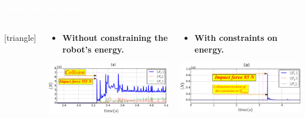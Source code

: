 \begin{frame}
\frametitle{{\textcolor{white}{\hspace{0.2cm}Simulation results 1}}}
\begin{columns}
\column{\dimexpr\paperwidth-4pt}
[triangle] 
\begin{itemize}
\begin{columns}
\column{.5\paperwidth}
\begin{center}
\begin{itemize}
\addtolength{\itemindent}{3mm}
\item \textbf{Without constraining the robot's energy.}
\end{itemize}
\vspace{0.5mm}
\hspace{1mm}
\includegraphics[width=0.89\columnwidth]{figures/ep__f_tau_!!!!1.pdf}
\end{center}

\begin{center}
\begin{itemize}
\addtolength{\itemindent}{1mm}
\item \textbf{With constraints on energy.}
\end{itemize}
\vspace{0.5mm}
\includegraphics[width=0.89\columnwidth]{figures/ep__f_tau65_!!!!1}

\end{center}

\end{columns}
\end{itemize}
\end{columns}

\end{frame}











